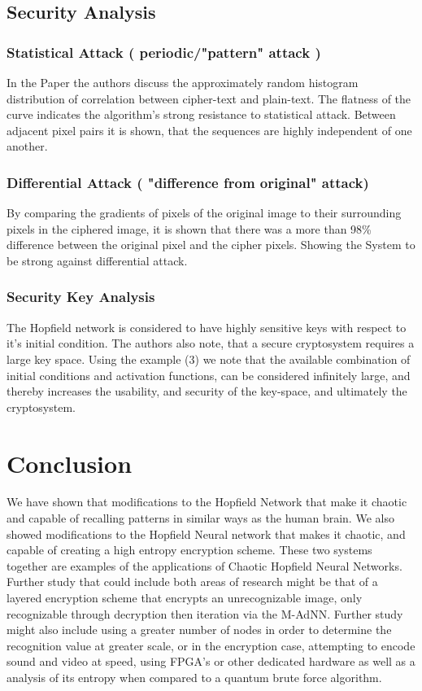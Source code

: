 \documentclass[12pt, letterpaper]{article}
\begin{document}
\subsection*{Security Analysis}
\subsubsection*{Statistical Attack ( periodic/"pattern" attack )}
In the Paper the authors discuss the approximately random histogram distribution of correlation between cipher-text and plain-text. The flatness of the curve indicates the algorithm's strong resistance to statistical attack. Between adjacent pixel pairs it is shown, that the sequences are highly independent of one another.
\subsubsection*{Differential Attack ( "difference from original" attack) }
By comparing the gradients of pixels of the original image to their surrounding pixels in the ciphered image, it is shown that there was a more than 98\% difference between the original pixel and the cipher pixels. Showing the System to be strong against differential attack.
\subsubsection*{Security Key Analysis}
The Hopfield network is considered to have highly sensitive keys with respect to it's initial condition. The authors also note, that a secure cryptosystem requires a large key space. Using the example (3) we note that the available combination of initial conditions and activation functions,  can be considered infinitely large, and thereby increases the usability, and security of the key-space, and ultimately the cryptosystem. 


\section*{Conclusion}

We have shown that modifications to the Hopfield Network that make it chaotic and capable of recalling patterns in similar ways as the human brain.  We also showed modifications to the Hopfield Neural network that makes it chaotic, and capable of creating a high entropy encryption scheme. These two systems together are examples of the applications of Chaotic Hopfield Neural Networks. Further study that could include both areas of research might be that of a layered encryption scheme that encrypts an unrecognizable image, only recognizable through decryption then iteration via the M-AdNN. Further study might also include using a greater number of nodes in order to determine the recognition value at greater scale, or in the encryption case, attempting to encode sound and video at speed, using FPGA's or other dedicated hardware as well as a analysis of its entropy when compared to a quantum brute force algorithm.
\end{document}
